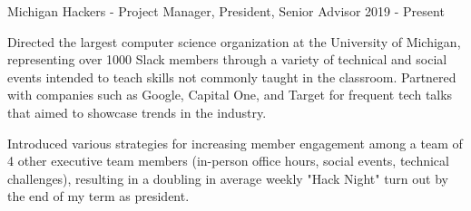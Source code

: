 

\begin{cventries}

  \cventry
    {} %
    {Michigan Hackers - Project Manager, President, Senior Advisor} %
    {2019 - Present} %
    {} %
    {
    \vspace{-4.5mm}
      \begin{cvitems} %
        \item {Directed the largest computer science organization at the University of Michigan, representing over 1000 Slack members through a variety of technical and social events intended to teach skills not commonly taught in the classroom. Partnered with companies such as Google, Capital One, and Target for frequent tech talks that aimed to showcase trends in the industry.}
        \item {Introduced various strategies for increasing member engagement among a team of 4 other executive team members (in-person office hours, social events, technical challenges), resulting in a doubling in average weekly "Hack Night" turn out by the end of my term as president.}
      \end{cvitems}
    }
    


\end{cventries}
